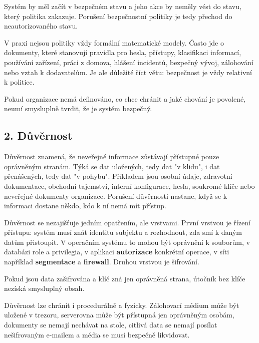 Systém by měl začít v bezpečném stavu a jeho akce by neměly vést do stavu, který politika zakazuje. Porušení bezpečnostní politiky je tedy přechod do neautorizovaného stavu.

V praxi nejsou politiky vždy formální matematické modely. Často jde o dokumenty, které stanovují pravidla pro hesla, přístupy, klasifikaci informací, používání zařízení, práci z domova, hlášení incidentů, bezpečný vývoj, zálohování nebo vztah k dodavatelům. Je ale důležité říct větu: bezpečnost je vždy relativní k politice.

Pokud organizace nemá definováno, co chce chránit a jaké chování je povolené, neumí smysluplně tvrdit, že je systém bezpečný.


\subsection*{2. Důvěrnost}

Důvěrnost znamená, že neveřejné informace zůstávají přístupné pouze oprávněným stranám. Týká se dat uložených, tedy dat "v klidu", i dat přenášených, tedy dat "v pohybu". Příkladem jsou osobní údaje, zdravotní dokumentace, obchodní tajemství, interní konfigurace, hesla, soukromé klíče nebo neveřejné dokumenty organizace. Porušení důvěrnosti nastane, když se k informaci dostane někdo, kdo k ní nemá mít přístup.

Důvěrnost se nezajišťuje jedním opatřením, ale vrstvami. První vrstvou je řízení přístupu: systém musí znát identitu subjektu a rozhodnout, zda smí k daným datům přistoupit. V operačním systému to mohou být oprávnění k souborům, v databázi role a privilegia, v aplikaci \textbf{autorizace} konkrétní operace, v síti například \textbf{segmentace} a \textbf{firewall}. Druhou vrstvou je šifrování.

Pokud jsou data zašifrována a klíč zná jen oprávněná strana, útočník bez klíče nezíská smysluplný obsah.

Důvěrnost lze chránit i procedurálně a fyzicky. Zálohovací médium může být uložené v trezoru, serverovna může být přístupná jen oprávněným osobám, dokumenty se nemají nechávat na stole, citlivá data se nemají posílat nešifrovaným e-mailem a média se musí bezpečně likvidovat.

